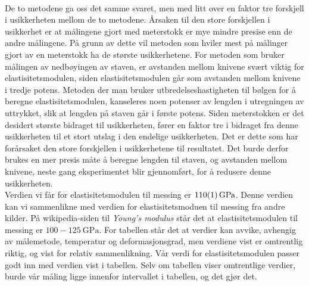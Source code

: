 \documentclass[%
 reprint,
 amsmath,amssymb,
 aps,
 norsk,
 booktabs
]{revtex4-1}
\begin{document}
\\De to metodene ga oss det samme svaret, men med litt over en faktor tre forskjell i usikkerheten mellom de to metodene. Årsaken til den store forskjellen i usikkerhet er at målingene gjort med meterstokk er mye mindre presise enn de andre målingene. På grunn av dette vil metoden som hviler mest på målinger gjort av en meterstokk ha de største usikkerhetene. For metoden som bruker målingen av nedbøyingen av staven, er avstanden mellom knivene svært viktig for elastisitetsmodulen, siden elastisitetsmodulen går som avstanden mellom knivene i tredje potens. Metoden der man bruker utbredelseshastigheten til bølgen for å beregne elastisitetsmodulen, kanseleres noen potenser av lengden i utregningen av uttrykket, slik at lengden på staven går i første potens. Siden meterstokken er det desidert største bidraget til usikkerheten, fører en faktor tre i bidraget fra denne usikkerheten til et stort utslag i den endelige usikkerheten. Det er dette som har forårsaket den store forskjellen i usikkerhetene til resultatet. Det burde derfor brukes en mer presis måte å beregne lengden til staven, og avstanden mellom knivene, neste gang eksperimentet blir gjennomført, for å redusere denne usikkerheten.\\
Verdien vi får for elastisitetsmodulen til messing er $\SI{110\pm1}{\giga\pascal}$. Denne verdien kan vi sammenlikne med verdien for elastisitetsmoduen til messing fra andre kilder. På wikipedia-siden til \textit{Young's modulus} \cite{wiki1} står det at elastisitetsmodulen til messing er $100-\SI{125}{\giga\pascal}$. For tabellen står det at verdier kan avvike, avhengig av målemetode, temperatur og deformasjonsgrad, men verdiene vist er omtrentlig riktig, og vist for relativ sammenlikning. Vår verdi for elastisitetsmodulen passer godt inn med verdien vist i tabellen. Selv om tabellen viser omtrentlige verdier, burde vår måling ligge innenfor intervallet i tabellen, og det gjør det.
\end{document}
